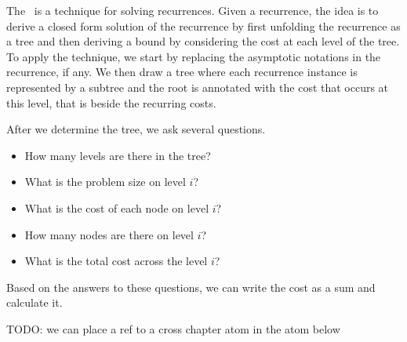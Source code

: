 \begin{definition}
The~ is a technique for solving recurrences.
%
Given a recurrence, the idea is to derive a closed form solution of
the recurrence by first unfolding the recurrence as a tree and then
deriving a bound by considering the cost at each level of the tree.
%
To apply the technique, we start by replacing the asymptotic notations
in the recurrence, if any.
%
We then draw a tree where each recurrence instance is represented by a
subtree and the root is annotated with the cost that occurs at this
level, that is beside the recurring costs. 

After we determine the tree, we ask several questions.
%
\begin{itemize}
\item How many levels are there in the tree?
\item What is the problem size on level $i$?
\item What is the cost of each node on level $i$?
\item How many nodes are there on level $i$?
\item What is the total cost across the level $i$?
\end{itemize}

Based on the answers to these questions, we can write the cost as a
sum and calculate it.
\end{definition}


\begin{teachnote}
TODO: we can place a ref to a cross chapter atom in the atom below
\end{teachnote}

